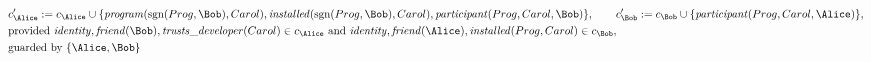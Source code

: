 \begin{align*}
&
c'_
{
\Alice
}
 := 
c_
{
\Alice
}
 \cup 
\{
\mathit{\detokenize{
program
}}
(
\mathrm{sgn}(
Prog
,
\Bob
)
,
Carol
)
,
\mathit{\detokenize{
installed
}}
(
\mathrm{sgn}(
Prog
,
\Bob
)
,
Carol
)
,
\mathit{\detokenize{
participant
}}
(
Prog
,
Carol
,
\Bob
)
\}
, \qquad 
c'_
{
\Bob
}
 := 
c_
{
\Bob
}
 \cup 
\{
\mathit{\detokenize{
participant
}}
(
Prog
,
Carol
,
\Alice
)
\}
,\\
&
\text{provided } 
\mathit{\detokenize{
identity
}}
,
\mathit{\detokenize{
friend
}}
(
\Bob
)
,
\mathit{\detokenize{
trusts_developer
}}
(
Carol
)
 \in c_
{
\Alice
}
 \text{ and } 
\mathit{\detokenize{
identity
}}
,
\mathit{\detokenize{
friend
}}
(
\Alice
)
,
\mathit{\detokenize{
installed
}}
(
Prog
,
Carol
)
 \in c_
{
\Bob
}
,\\
&
\text{guarded by } \{
\Alice
,
\Bob
\}
\end{align*}

